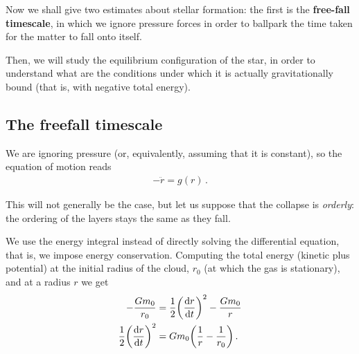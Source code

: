 \documentclass[main.tex]{subfiles}
\begin{document}
Now we shall give two estimates about stellar formation: the first is the \textbf{free-fall timescale}, in which we ignore pressure forces in order to ballpark the time taken for the matter to fall onto itself.

Then, we will study the equilibrium configuration of the star, in order to understand what are the conditions under which it is actually gravitationally bound (that is, with negative total energy).




\subsection{The freefall timescale}

We are ignoring pressure (or, equivalently, assuming that it is constant), so the equation of motion reads
%
\begin{align}
  - \ddot{r} = g(r)
\,.
\end{align}

This will not generally be the case, but let us suppose that the collapse is \emph{orderly}: the ordering of the layers stays the same as they fall. 

We use the energy integral instead of directly solving the differential equation, that is, we impose energy conservation.
Computing the total energy (kinetic plus potential) at the initial radius of the cloud, \(r_0 \) (at which the gas is stationary), and at a radius \(r\) we get 
%
\begin{align}
  - \frac{G m_0 }{r_0 } &= \frac{1}{2} \qty(\dv{r}{t})^2 - \frac{Gm_0 }{r} \\
  \frac{1}{2} \qty(\dv{r}{t})^2 &= G m_0 \qty( \frac{1}{r} - \frac{1}{r_0 })
\,.
\end{align}
\end{document}
